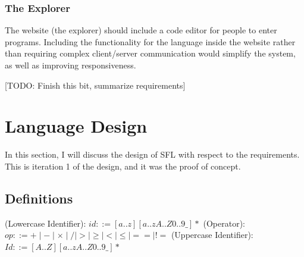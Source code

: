\subsubsection{The Explorer}
The website (the explorer) should include a code editor for people to enter programs. Including the functionality for the language inside the website rather than requiring complex client/server communication would simplify the system, as well as improving responsiveness. 

[TODO: Finish this bit, summarize requirements]

\section{Language Design}
In this section, I will discuss the design of \ac{SFL} with respect to the requirements. This is iteration 1 of the design, and it was the proof of concept.  

\subsection{Definitions}

\begin{syntax}
\label{def:identifier_syntax}
(Lowercase Identifier): \(id ::= [a..z][a..zA..Z0..9\_]*\)\newline
(Operator): \(op ::= + \mid - \mid \times \mid / \mid > \mid \ge \mid < \mid \le \mid== \mid \mathrel{\mathtt{!=}} \)\newline
(Uppercase Identifier): \(Id ::= [A..Z][a..zA..Z0..9\_]*\)
\end{syntax}

